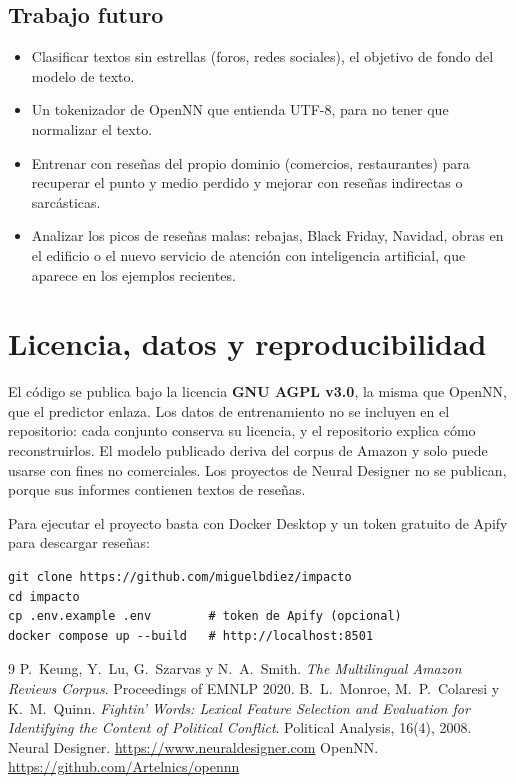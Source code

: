 \documentclass[11pt,a4paper]{article}
\begin{document}
\subsection{Trabajo futuro}

\begin{itemize}
  \item Clasificar textos sin estrellas (foros, redes sociales), el objetivo de fondo del modelo de texto.
  \item Un tokenizador de OpenNN que entienda UTF-8, para no tener que normalizar el texto.
  \item Entrenar con reseñas del propio dominio (comercios, restaurantes) para recuperar el punto y medio perdido y
        mejorar con reseñas indirectas o sarcásticas.
  \item Analizar los picos de reseñas malas: rebajas, Black Friday, Navidad, obras en el edificio o el nuevo
        servicio de atención con inteligencia artificial, que aparece en los ejemplos recientes.
\end{itemize}

\section*{Licencia, datos y reproducibilidad}

El código se publica bajo la licencia \textbf{GNU AGPL v3.0}, la misma que OpenNN, que el predictor enlaza. Los
datos de entrenamiento no se incluyen en el repositorio: cada conjunto conserva su licencia, y el repositorio
explica cómo reconstruirlos. El modelo publicado deriva del corpus de Amazon y solo puede usarse con fines no
comerciales. Los proyectos de Neural Designer no se publican, porque sus informes contienen textos de reseñas.

Para ejecutar el proyecto basta con Docker Desktop y un token gratuito de Apify para descargar reseñas:

\begin{Verbatim}[fontsize=\small, frame=leftline, framesep=8pt, rulecolor=\color{accent}]
git clone https://github.com/miguelbdiez/impacto
cd impacto
cp .env.example .env        # token de Apify (opcional)
docker compose up --build   # http://localhost:8501
\end{Verbatim}

\begin{thebibliography}{9}
 P.~Keung, Y.~Lu, G.~Szarvas y N.~A.~Smith. \emph{The Multilingual Amazon Reviews Corpus}.
  Proceedings of EMNLP 2020.
 B.~L.~Monroe, M.~P.~Colaresi y K.~M.~Quinn. \emph{Fightin' Words: Lexical Feature Selection
  and Evaluation for Identifying the Content of Political Conflict}. Political Analysis, 16(4), 2008.
 Neural Designer. \url{https://www.neuraldesigner.com}
 OpenNN. \url{https://github.com/Artelnics/opennn}
\end{thebibliography}
\end{document}
